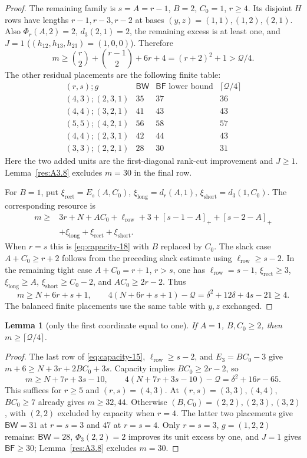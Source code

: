 \documentclass[11pt]{article}
\newtheorem{lemma}[theorem]{Lemma}
\theoremstyle{definition}
\theoremstyle{remark}
\theoremstyle{plain}
\begin{document}
\begin{proof}
The remaining family is $s=A=r-1$, $B=2$, $C_0=1$, $r\ge4$.
Its disjoint $H$ rows have lengths $r-1,r-3,r-2$ at bases
$(y,z)=(1,1),(1,2),(2,1)$.  Also $\Phi_r(A,2)=2$,
$d_3(2,1)=2$, the remaining excess is at least one, and $J=1$
($(h_{12},h_{13},h_{23})=(1,0,0)$).  Therefore
\[
 m\ge\binom r2+\binom{r-1}2+6r+4=(r+2)^2+1>\mathcal Q/4.
\]
The other residual placements are the following finite table:
\[
\begin{array}{c|r|r|r}
(r,s);g&\mathsf{BW}&\mathsf{BF}\text{ lower bound}&\lceil \mathcal Q/4\rceil\\\hline
(4,3);(2,3,1)&35&37&36\\
(4,4);(3,2,1)&41&43&43\\
(5,5);(4,2,1)&56&58&57\\
(4,4);(2,3,1)&42&44&43\\
(3,3);(2,2,1)&28&30&31
\end{array}
\]
Here the two added units are the first-diagonal rank-cut improvement
and $J\ge1$.  Lemma~\ref{res:A3.8} excludes $m=30$ in the final row.

For $B=1$, put $\xi_{\mathrm{rect}}=E_s(A,C_0)$, $\xi_{\mathrm{long}}=d_r(A,1)$, $\xi_{\mathrm{short}}=d_3(1,C_0)$.
The corresponding resource is
\[
\begin{split}
 m\ge{}&3r+N+AC_0+\ell_{\mathrm{row}}+3+[s-1-A]_++[s-2-A]_+\\
 &+\xi_{\mathrm{long}}+\xi_{\mathrm{rect}}+\xi_{\mathrm{short}}.
\end{split}\tag{3.20}\label{eq:capacity-20}
\]
When $r=s$ this is \eqref{eq:capacity-18} with $B$ replaced by $C_0$.
The slack case $A+C_0\ge r+2$ follows from the preceding slack estimate
using $\ell_{\mathrm{row}}\ge s-2$.  In the remaining tight case $A+C_0=r+1$, $r>s$,
one has $\ell_{\mathrm{row}}=s-1$, $\xi_{\mathrm{rect}}\ge3$, $\xi_{\mathrm{long}}\ge A$, $\xi_{\mathrm{short}}\ge C_0-2$, and
$AC_0\ge2r-2$.  Thus
\[
 m\ge N+6r+s+1,\qquad
 4(N+6r+s+1)-\mathcal Q=\delta^2+12\delta+4s-21\ge4.
\]
The balanced finite placements use the same table with $y,z$ exchanged.
\end{proof}

\begin{lemma}[only the first coordinate equal to one]\label{res:A3.5}
If $A=1$, $B,C_0\ge2$, then $m\ge\lceil \mathcal Q/4\rceil$.
\end{lemma}
\begin{proof}
The last row of \eqref{eq:capacity-15}, $\ell_{\mathrm{row}}\ge s-2$, and $E_3=BC_0-3$ give
$m+6\ge N+3r+2BC_0+3s$.  Capacity implies
$BC_0\ge2r-2$, so
\[
 m\ge N+7r+3s-10,\qquad
 4(N+7r+3s-10)-\mathcal Q=\delta^2+16r-65.
\]
This suffices for $r\ge5$ and $(r,s)=(4,3)$.
At $(r,s)=(3,3),(4,4)$, $BC_0\ge7$ already gives $m\ge32,44$.
Otherwise $(B,C_0)=(2,2),(2,3),(3,2)$, with $(2,2)$ excluded by
capacity when $r=4$.  The latter two placements give
$\mathsf{BW}=31$ at $r=s=3$ and $47$ at $r=s=4$.
Only $r=s=3$, $g=(1,2,2)$ remains: $\mathsf{BW}=28$,
$\Phi_3(2,2)=2$ improves its unit excess by one, and $J=1$ gives
$\mathsf{BF}\ge30$; Lemma~\ref{res:A3.8} excludes $m=30$. \end{proof}
\end{document}
